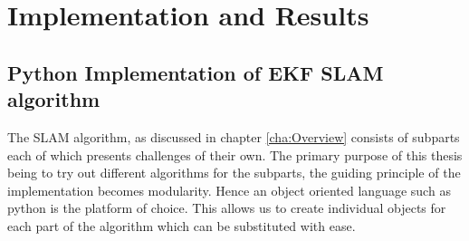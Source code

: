 \chapter{Implementation and Results}
\label{cha:results}

\section{Python Implementation of EKF SLAM algorithm}

The SLAM algorithm, as discussed in chapter \ref{cha:Overview} consists of subparts each of which presents challenges of their own. The primary purpose of this thesis being to try out different algorithms for the subparts, the guiding principle of the implementation becomes modularity. Hence an object oriented language such as python is the platform of choice. This allows us to create individual objects for each part of the algorithm which can be substituted with ease. 

